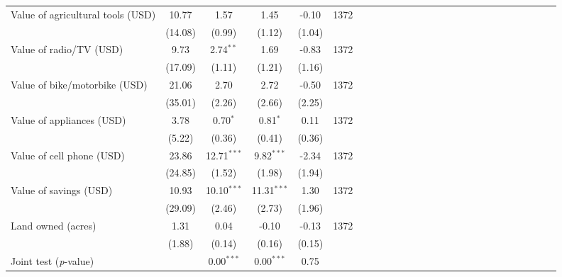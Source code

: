 {\begin{tabular}{l*{5}{SSSSc}}
\hspace{0.2cm}Value of agricultural tools (USD)&    10.77&     1.57&     1.45&    -0.10&     1372\\
          &  (14.08)&   (0.99)&   (1.12)&   (1.04)&         \\
\hspace{0.2cm}Value of radio/TV (USD)&     9.73&2.74$^{**}$&     1.69&    -0.83&     1372\\
          &  (17.09)&   (1.11)&   (1.21)&   (1.16)&         \\
\hspace{0.2cm}Value of bike/motorbike (USD)&    21.06&     2.70&     2.72&    -0.50&     1372\\
          &  (35.01)&   (2.26)&   (2.66)&   (2.25)&         \\
\hspace{0.2cm}Value of appliances (USD)&     3.78&0.70$^{*}$&0.81$^{*}$&     0.11&     1372\\
          &   (5.22)&   (0.36)&   (0.41)&   (0.36)&         \\
\hspace{0.2cm}Value of cell phone (USD)&    23.86&12.71$^{***}$&9.82$^{***}$&    -2.34&     1372\\
          &  (24.85)&   (1.52)&   (1.98)&   (1.94)&         \\
Value of savings (USD)&    10.93&10.10$^{***}$&11.31$^{***}$&     1.30&     1372\\
          &  (29.09)&   (2.46)&   (2.73)&   (1.96)&         \\
Land owned (acres)&     1.31&     0.04&    -0.10&    -0.13&     1372\\
          &   (1.88)&   (0.14)&   (0.16)&   (0.15)&         \\
\midrule Joint test (\emph{p}-value)&         &{0.00$^{***}$}&{0.00$^{***}$}&   {0.75}&         \\
\bottomrule
\end{tabular}
}
